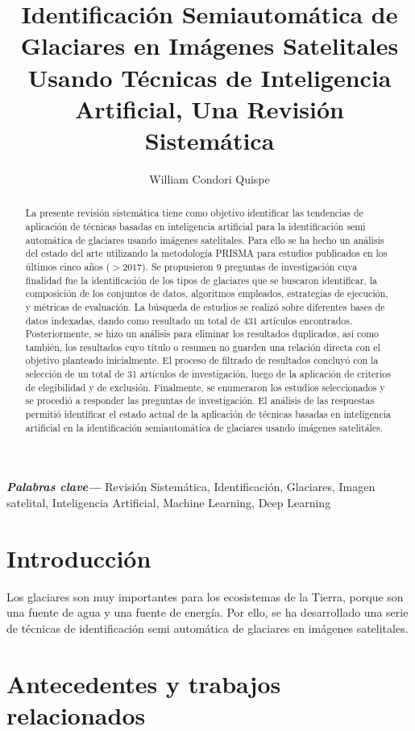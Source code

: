\documentclass{article}
\title{Identificación Semiautomática de Glaciares en Imágenes Satelitales Usando Técnicas de Inteligencia Artificial, Una Revisión Sistemática}
\author{William Condori Quispe}
\date{}
\providecommand{\keywords}[1]{\textbf{\textit{Palabras clave---}} #1}
\begin{document}
\maketitle

\begin{abstract}

    La presente revisión sistemática tiene como objetivo identificar las tendencias de aplicación de técnicas basadas en inteligencia artificial para la identificación semi automática de glaciares usando imágenes satelitales. Para ello se ha hecho un análisis del estado del arte utilizando la metodología PRISMA para estudios publicados en los últimos cinco años ($>2017$). Se propusieron 9 preguntas de investigación cuya finalidad fue la identificación de los tipos de glaciares que se buscaron identificar, la composición de los conjuntos de datos, algoritmos empleados, estrategias de ejecución, y métricas de evaluación. La búsqueda de estudios se realizó sobre diferentes bases de datos indexadas, dando como resultado un total de 431 artículos encontrados. Posteriormente, se hizo un análisis para eliminar los resultados duplicados, así como también, los resultados cuyo título o resumen no guarden una relación directa con el objetivo planteado inicialmente. El proceso de filtrado de resultados concluyó con la selección de un total de 31 artículos de investigación, luego de la aplicación de criterios de elegibilidad y de exclusión. Finalmente, se enumeraron los estudios seleccionados y se procedió a responder las preguntas de investigación. El análisis de las respuestas permitió identificar el estado actual de la aplicación de técnicas basadas en inteligencia artificial en la identificación semiautomática de glaciares usando imágenes satelitáles.
\end{abstract}

\keywords{
    Revisión Sistemática,
    Identificación,
    Glaciares,
    Imagen satelital,
    Inteligencia Artificial,
    Machine Learning,
    Deep Learning
}


\section{Introducción}

Los glaciares son muy importantes para los ecosistemas de la Tierra, porque son una fuente de agua y una fuente de energía. Por ello, se ha desarrollado una serie de técnicas de identificación semi automática de glaciares en imágenes satelitales.

\section{Antecedentes y trabajos relacionados}
\end{document}
